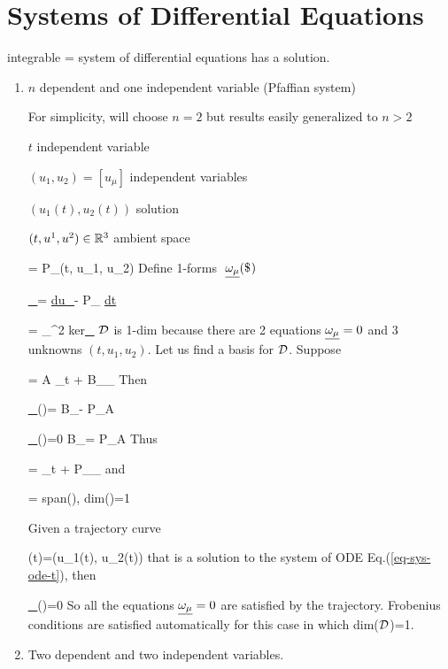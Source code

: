 \section{Systems of Differential Equations}

integrable = system of differential
equations has a solution.

\begin{enumerate}

\item $n$ dependent and one independent variable (Pfaffian system)

For simplicity, will 
choose $n=2$ but results
easily generalized to $n>2$ 

$t$ independent variable

$(u_1, u_2)=[u_\mu]$ independent variables

$(u_1(t), u_2(t))$ solution

$(t, u^1, u^2)\in { \mathbb{R}}^3$ ambient space

\beq
{}=
P_\mu (t, u_1, u_2)
\label{eq-sys-ode-t}
\eeq
Define 1-forms $\pform{\omega_\mu}{}$

\beq
\ul{\omega_\mu}=
\ul{du_\mu}- P_\mu
\ul{dt}
\eeq

\beq
\cald = \cap_{}^2
{\rm ker\;}\ul{\omega_\mu}
\eeq
${\cal D}$ is 1-dim because there are 2 equations $\ul{\omega_\mu}=0$ and 3 unknowns $(t, u_1, u_2)$.
Let us find a basis
for ${\cal D}$.
Suppose

\beq
\vecV = A \vecpartial_t
+ B_\mu \vecpartial_\mu
\eeq
Then 

\beq
\ul{\omega_\mu}(\vecV)=
B_\mu - P_\mu A
\eeq

\beq
\ul{\omega_\mu}(\vecV)=0
\implies B_\mu = P_\mu A
\eeq
Thus 

\beq
\vecV = \vecpartial_t +
P_\mu \vecpartial_\mu
\eeq
and

\beq \cald = span(\vecV), \quad 
dim(\cald)=1
\eeq

Given a trajectory curve

\beq  {}(t)=(u_1(t), u_2(t))
\eeq
that is a solution to the system 
of ODE Eq.(\ref{eq-sys-ode-t}),
then

\beq
{}\ul{\omega_\mu}(\vecX)=0
\eeq
So all the equations
$\ul{\omega_\mu}=0$ are satisfied by the trajectory.
Frobenius conditions
are satisfied
automatically for this case in which dim(${\cal D}$)=1.




\item Two dependent and two independent variables.




\end{enumerate}
